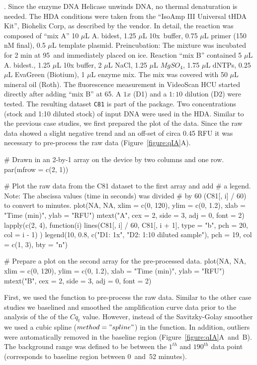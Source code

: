 \citep{roediger_RJ_2013, rodiger_highly_2013}. Since the enzyme DNA Helicase 
unwinds DNA, no thermal denaturation is needed. The HDA conditions were taken 
from the ``IsoAmp III Universal tHDA Kit'', Biohelix Corp, as described by the 
vendor. In detail, the reaction was composed of ``mix A'' 10 $\mu$L A. bidest, 
1.25 $\mu$L 10x~buffer, 0.75 $\mu$L primer (150 nM final), 0.5 $\mu$L template 
plasmid. Preincubation: The mixture was incubated for 2 min at 
95\textcelsius~and immediately placed on ice. Reaction ``mix B'' contained 5 
$\mu$L A. bidest., 1.25 $\mu$L 10x buffer, 2 $\mu$L NaCl, 1.25 $\mu$L 
$MgSO_{4}$, 1.75 $\mu$L dNTPs, 0.25 $\mu$L EvaGreen (Biotium), 1 $\mu$L enzyme 
mix. The mix was covered with 50 $\mu$L mineral oil (Roth). The fluorescence 
measurement in VideoScan HCU started directly after adding ``mix B'' at 
65\textcelsius. A $1x$ (D1) and a $1:10$ dilution (D2) were tested. The 
resulting dataset \texttt{C81} is part of the  package. Two 
concentrations (stock and 1:10 diluted stock) of input DNA were used in the 
HDA. 
Similar to the previous case studies, we first prepared the plot of the data. 
Since the raw data showed a slight negative trend and an off-set of circa 0.45 
RFU it was necessary to pre-process the raw data (Figure~\ref{figure:qIA}A).

\begin{example}
# Drawn in an 2-by-1 array on the device by two columns and one row.
par(mfrow = c(2, 1))

# Plot the raw data from the C81 dataset to the first array and add
# a legend. Note: The abscissa values (time in seconds) was divided 
# by 60 (C81[, i] / 60) to convert to minutes.
plot(NA, NA, xlim = c(0, 120), ylim = c(0, 1.2), xlab = "Time (min)", ylab = 
"RFU")
mtext("A", cex = 2, side = 3, adj = 0, font = 2)
lapply(c(2, 4), function(i) {
  lines(C81[, i] / 60, C81[, i + 1], type = "b", pch = 20, col = i - 1)
})
legend(10, 0.8, c("D1: 1x", "D2: 1:10 diluted sample"), pch = 19, col = c(1, 
3), 
       bty = "n")

# Prepare a plot on the second array for the pre-processed data.
plot(NA, NA, xlim = c(0, 120), ylim = c(0, 1.2), xlab = "Time (min)", ylab = 
"RFU")
mtext("B", cex = 2, side = 3, adj = 0, font = 2)
\end{example}

First, we used the  function to pre-process the raw data. Similar to 
the other case studies we baselined and smoothed the amplification curve data 
prior to the analysis of the of the $Cq_{t}$ value. However, instead of the 
Savitzky-Golay smoother we used a cubic spline ($method = "spline"$) in the 
 function. In addition, outliers were automatically removed in the 
baseline region (Figure~\ref{figure:qIA}A~and~B). The background range was 
defined to be between the $1^{th}$ and $190^{th}$ data point (corresponds to 
baseline region between 0~and~52 minutes).

